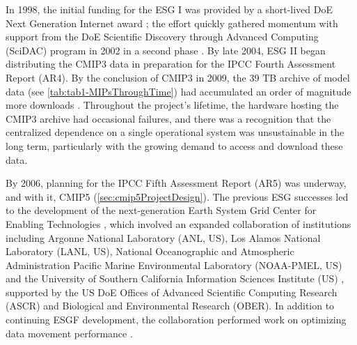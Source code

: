 \documentclass[manuscript]{copernicus}
\begin{document}
In 1998, the initial funding for the ESG I was provided by a short-lived DoE Next Generation Internet award \citep{hammond_doe_1999}; 
the effort quickly gathered momentum with support from the DoE Scientific Discovery through Advanced Computing (SciDAC) program in 2002 in a second phase \citep[ESG II;][]{williams_earth_2009}. By late 2004, ESG II began distributing the CMIP3 data in preparation for the IPCC Fourth Assessment Report (AR4). By the conclusion of CMIP3 in 2009, the 39 TB archive of model data (see \autoref{tab:tab1-MIPsThroughTime}) had accumulated an order of magnitude more downloads \citep[470 TB;][]{ananthakrishnan_building_2007, williams_earth_2009}. Throughout the project's lifetime, the hardware hosting the CMIP3 archive had occasional failures, and there was a recognition that the centralized dependence on a single operational system was unsustainable in the long term, particularly with the growing demand to access and download these data.

By 2006, planning for the IPCC Fifth Assessment Report (AR5) was underway, and with it, CMIP5 (\autoref{sec:cmip5ProjectDesign}). The previous ESG successes led to the development of the next-generation Earth System Grid Center for Enabling Technologies \citep[ESG-CET;][]{williams_earth_2007}, which involved an expanded collaboration of institutions including Argonne National Laboratory (ANL, US), Los Alamos National Laboratory (LANL, US), National Oceanographic and Atmospheric Administration Pacific Marine Environmental Laboratory (NOAA-PMEL, US) and the University of Southern California Information Sciences Institute (US) \citep{ananthakrishnan_building_2007}, supported by the US DoE Offices of Advanced Scientific Computing Research (ASCR) and Biological and Environmental Research (OBER). In addition to continuing ESGF development, the collaboration performed work on optimizing data movement performance \citep{kettimuthu_lessons_2010}.
\end{document}
